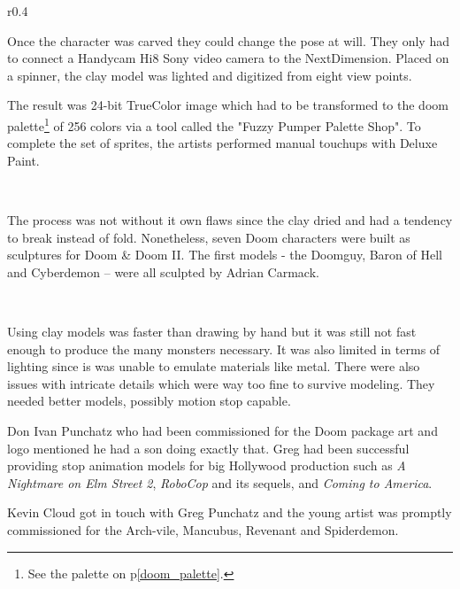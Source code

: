 \begin{wrapfigure}[9]{r}{0.4\textwidth}
\centering
{}
\end{wrapfigure}
Once the character was carved they could change the pose at will. They only had to connect a Handycam Hi8 Sony video camera to the NextDimension. Placed on a spinner, the clay model was lighted and digitized from eight view points.\\
\par
The result was 24-bit TrueColor image which had to be transformed to the doom palette\footnote{See the \doom palette on p\ref{doom_palette}.} of 256 colors via a tool called the "Fuzzy Pumper Palette Shop". To complete the set of sprites, the artists performed manual touchups with Deluxe Paint.\\
\par
{}\\
\par
The process was not without it own flaws since the clay dried and had a tendency to break instead of fold. Nonetheless, seven Doom characters were built as sculptures for Doom \& Doom II. The first models - the Doomguy, Baron of Hell and Cyberdemon -- were all sculpted by Adrian Carmack.\\
\par
{}

\par
{}\\
\par




\par
Using clay models was faster than drawing by hand but it was still not fast enough to produce the many monsters necessary. It was also limited in terms of lighting since is was unable to emulate materials like metal. There were also issues with intricate details which were way too fine to survive modeling. They needed better models, possibly motion stop capable.\\
\par
Don Ivan Punchatz who had been commissioned for the Doom package art and logo mentioned he had a son doing exactly that. Greg had been successful providing stop animation models for big Hollywood production such as \textit{A Nightmare on Elm Street 2}, \textit{RoboCop} and its sequels, and \textit{Coming to America}. \\
\par
Kevin Cloud got in touch with Greg Punchatz and the young artist was promptly commissioned for the Arch-vile, Mancubus, Revenant and Spiderdemon.\\
\par

